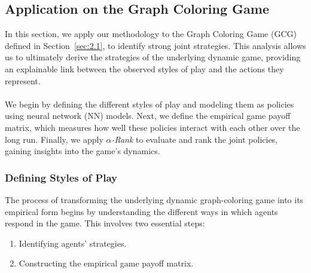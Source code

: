 \subsection{Application on the Graph Coloring Game}

\begin{flushleft}

    In this section, we apply our methodology to the Graph Coloring Game (GCG) defined in Section~\ref{sec:2.1}, to identify strong joint strategies. This analysis allows us to ultimately derive the strategies of the underlying dynamic game, providing an explainable link between the observed styles of play and the actions they represent.\\~\\

    We begin by defining the different styles of play and modeling them as policies using neural network (NN) models. Next, we define the empirical game payoff matrix, which measures how well these policies interact with each other over the long run. Finally, we apply \emph{$\alpha$-Rank} to evaluate and rank the joint policies, gaining insights into the game's dynamics.

    \subsubsection{Defining Styles of Play}
    \label{sec:5.1}

    \begin{flushleft}

        The process of transforming the underlying dynamic graph-coloring game into its empirical form begins by understanding the different ways in which agents respond in the game. This involves two essential steps:
        \begin{enumerate}
            \item Identifying agents' strategies.
            \item Constructing the empirical game payoff matrix.\\~\\
        \end{enumerate}


\end{flushleft}
\end{flushleft}
